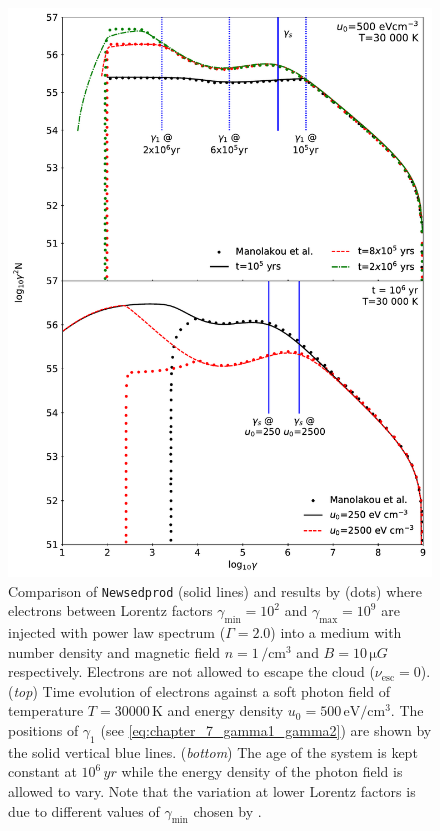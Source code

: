 \begin{figure}[hbtp]
    \centering
    \includegraphics[width=\textwidth]{07_Particle_Evolution/Images/Code/manolakou_verification.pdf}
    \caption{Comparison of {\tt Newsedprod} (solid lines) and results by \cite{2007A&A...474..689M} (dots) where electrons between Lorentz factors $\gamma_\text{min}=10^2$ and $\gamma_\text{max}=10^9$ are injected with power law spectrum ($\Gamma =2.0$) into a medium with number density and magnetic field $n=1\,\si{\per\centi\meter\cubed}$ and $B=10\,\si{\micro G}$ respectively. Electrons are not allowed to escape the cloud ($\nu_\text{esc}=0$). (\textit{top}) Time evolution of electrons against a soft photon field of temperature $T=30000\,\si{\kelvin}$ and energy density $u_0=500\,\si{\electronvolt\per\centi\meter\cubed}$.  The positions of $\gamma_1$ (see \autoref{eq:chapter_7_gamma1_gamma2}) are shown by the solid vertical blue lines. (\textit{bottom}) The age of the system is kept constant at $10^6\,\si{yr}$ while the energy density of the photon field is allowed to vary. Note that the variation at lower Lorentz factors is due to different values of $\gamma_\text{min}$ chosen by \cite{2007A&A...474..689M}.}
    \label{fig:chapter_7_manolakou_verification}
\end{figure}

